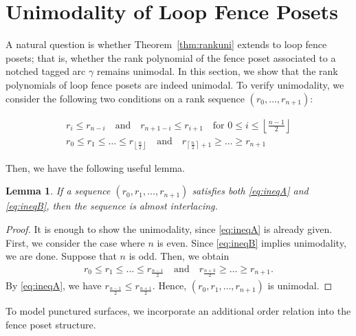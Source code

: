 \documentclass{article}
\newtheorem{lemma}{Lemma}
\theoremstyle{remark}
\begin{document}
\section{Unimodality of Loop Fence Posets}\label{sec:uniloop}

A natural question is whether Theorem~\ref{thm:rankuni} extends to loop fence posets; that is, whether the rank polynomial of the fence poset associated to a notched tagged arc \( \gamma \) remains unimodal. In this section, we show that the rank polynomials of loop fence posets are indeed unimodal. To verify unimodality, we consider the following two conditions on a rank sequence $(r_0,\ldots,r_{n+1})$:

\begin{align*}
    r_{i} \leq r_{n-i} \quad \text{and}\quad
    r_{n+1-i} \leq r_{i+1} \quad \text{for } 0 \leq i \leq \left\lfloor \tfrac{n-1}{2} \right\rfloor \tag{Ineq A}\\
    r_{0} \leq r_{1} \leq \ldots \leq r_{\left\lfloor \frac{n}{2} \right\rfloor} \quad \text{and} \quad 
    r_{\left\lceil \frac{n}{2} \right\rceil + 1} \geq \ldots \geq r_{n+1} \tag{Ineq B} \label{eq:ineqB}
\end{align*}

Then, we have the following useful lemma.

\begin{lemma}\label{lem:ABau}
If a sequence $(r_0,r_1,\dots,r_{n+1})$ satisfies both \eqref{eq:ineqA} and \eqref{eq:ineqB}, then the sequence is almost interlacing.
\end{lemma}

\begin{proof}
It is enough to show the unimodality, since \eqref{eq:ineqA} is already given. First, we consider the case where $n$ is even. Since \eqref{eq:ineqB} implies unimodality, we are done. Suppose that $n$ is odd. Then, we obtain
\begin{align*}
    r_{0} \leq r_{1} \leq \ldots \leq r_{\frac{n-1}{2}} \quad \text{and} \quad 
    r_{\frac{n+3}{2}} \geq \ldots \geq r_{n+1}.
\end{align*}
By \eqref{eq:ineqA}, we have $r_{\frac{n-1}{2}}\le r_{\frac{n+1}{2}}$. Hence, $(r_0,r_1,\dots,r_{n+1})$ is unimodal.
\end{proof}

To model punctured surfaces, we incorporate an additional order relation into the fence poset structure.
\end{document}
